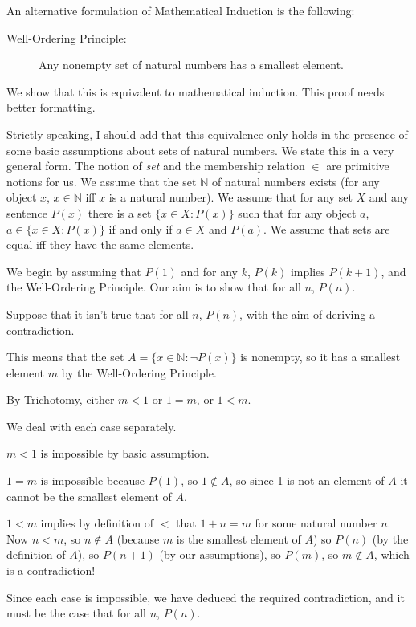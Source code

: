 \documentclass[12pt]{article}
\begin{document}
An alternative formulation of Mathematical Induction is the following:

\begin{description}

\item[Well-Ordering Principle:]  Any nonempty set of natural numbers has a smallest element.

\end{description}

We show that this is equivalent to mathematical induction.  This proof needs better formatting.

Strictly speaking, I should add that this equivalence only holds in the presence of some basic assumptions about sets of natural numbers.  We state this in a very general form.  The notion of {\em set\/} and the membership relation $\in$ are primitive notions for us.  We assume that the set $\mathbb N$ of natural numbers exists (for any object $x$, $x \in {\mathbb N}$ iff $x$ is a natural number).  We assume that for any set $X$ and any sentence $P(x)$ there is a set $\{x \in X : P(x)\}$ such that for any object $a$, $a \in \{x \in X : P(x)\}$ if and only if $a \in X$ and $P(a)$.  We assume that sets are equal iff they have the same elements.

We begin by assuming that $P(1)$ and for any $k$, $P(k)$ implies $P(k+1)$, and the Well-Ordering Principle.
Our aim is to show that for all $n$, $P(n)$.

Suppose that it isn't true that for all $n$, $P(n)$, with the aim of deriving a contradiction.

This means that the set $A=\{x \in {\mathbb N} :  \neg P(x)\}$ is nonempty, so it has a smallest element $m$ by the Well-Ordering Principle.

By Trichotomy, either $m<1$ or $1=m$, or $1<m$.

We deal with each case separately.

$m<1$ is impossible by basic assumption.

$1=m$ is impossible because $P(1)$, so $1 \not\in A$, so since 1 is not an element of $A$ it cannot be the smallest element of $A$.

$1<m$ implies by definition of $<$ that $1+n=m$ for some natural number $n$.  Now $n<m$, so $n \not\in A$ (because $m$ is the smallest element of $A$) so $P(n)$ (by the definition of $A$), so $P(n+1)$ (by our assumptions), so $P(m)$, so
$m \not\in A$, which is a contradiction!

Since each case is impossible, we have deduced the required contradiction, and it must be the case that for all $n$, $P(n)$.
\end{document}
